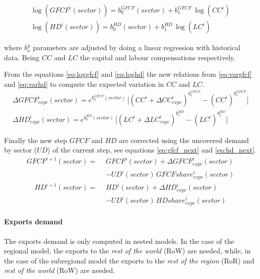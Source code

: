 \begin{gather}
\log\left(GFCF^i(sector)\right) = b_0^{GFCF}(sector) + b_1^{GFCF}\,\log\left(CC^i\right)\label{eq:loggfcf}\\
\log\left(HD^i(sector)\right) = b_0^{HD}(sector) + b_1^{HD}\,\log\left(LC^i\right)\label{eq:loghd}
\end{gather}

where $b_x^y$ parameters are adjusted by doing a linear regression with historical data. Being $CC$ and $LC$ the capital and labour compensations respectively.

From the equations \eqref{eq:loggfcf} and \eqref{eq:loghd} the new relations from \eqref{eq:vargfcf} and \eqref{eq:varhd} to compute the expected variation in $CC$ and $LC$.
\begin{gather}
\Delta GFCF^i_{expc}(sector) = e^{b_0^{GFCF}(sector)}\,\Big[\left(CC^i\!+\!\Delta CC_{expc}^i\right)^{b_1^{GFCF}}-\left(CC^{i}\right)^{b_1^{GFCF}}\Big]\label{eq:vargfcf}\\
\Delta HD^i_{expc}(sector) = e^{b_0^{HD}(sector)}\,\Big[\left(LC^i\!+\!\Delta LC_{expc}^i\right)^{b_1^{HD}}-\left(LC^{i}\right)^{b_1^{HD}}\Big]\label{eq:varhd}
\end{gather}


Finally the new step $GFCF$ and $HD$ are corrected using the uncovered demand by sector ($UD$) of the current step, see equations \eqref{eq:gfcf_next} and \eqref{eq:hd_next}.
    \begin{align}
    GFCF^{i+1}(sector) =\hspace{5pt}  &GFCF^i(sector)+\Delta GFCF^i_{expc}(sector)\nonumber\\
                        &-UD^i(sector)\,GFCFshare^i_{expc}(sector)\label{eq:gfcf_next}
    \end{align}
    \begin{align}
    HD^{i+1}(sector) =\hspace{5pt}  &HD^i(sector)+\Delta HD^i_{expc}(sector)\nonumber\\
                    &-UD^i(sector)\,HDshare^i_{expc}(sector)\label{eq:hd_next}
    \end{align}


\paragraph{Exports demand}
The exports demand is only computed in nested models. In the case of the regional model, the exports to the \emph{rest of the world} (RoW) are needed, while, in the case of the subregional model the exports to the \emph{rest of the region} (RoR) and \emph{rest of the world} (RoW) are needed.

